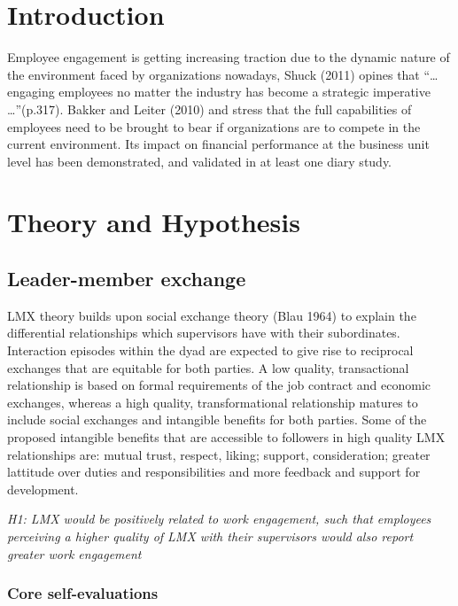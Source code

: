 \section{Introduction}\label{introduction}

Employee engagement is getting increasing traction due to the dynamic
nature of the environment faced by organizations nowadays, Shuck (2011)
opines that ``\ldots{} engaging employees no matter the industry has
become a strategic imperative \ldots{}''(p.317). Bakker and Leiter
(2010) and stress that the full capabilities of employees need to be
brought to bear if organizations are to compete in the current
environment. Its impact on financial performance at the business unit
level has been demonstrated, and validated in at least one diary study.

\section{Theory and Hypothesis}\label{theory-and-hypothesis}

\subsection{Leader-member exchange}\label{leader-member-exchange}

LMX theory builds upon social exchange theory (Blau 1964) to explain the
differential relationships which supervisors have with their
subordinates. Interaction episodes within the dyad are expected to give
rise to reciprocal exchanges that are equitable for both parties. A low
quality, transactional relationship is based on formal requirements of
the job contract and economic exchanges, whereas a high quality,
transformational relationship matures to include social exchanges and
intangible benefits for both parties. Some of the proposed intangible
benefits that are accessible to followers in high quality LMX
relationships are: mutual trust, respect, liking; support,
consideration; greater lattitude over duties and responsibilities and
more feedback and support for development.

\emph{H1: LMX would be positively related to work engagement, such that
employees perceiving a higher quality of LMX with their supervisors
would also report greater work engagement}

\subsubsection{Core self-evaluations}\label{core-self-evaluations}

